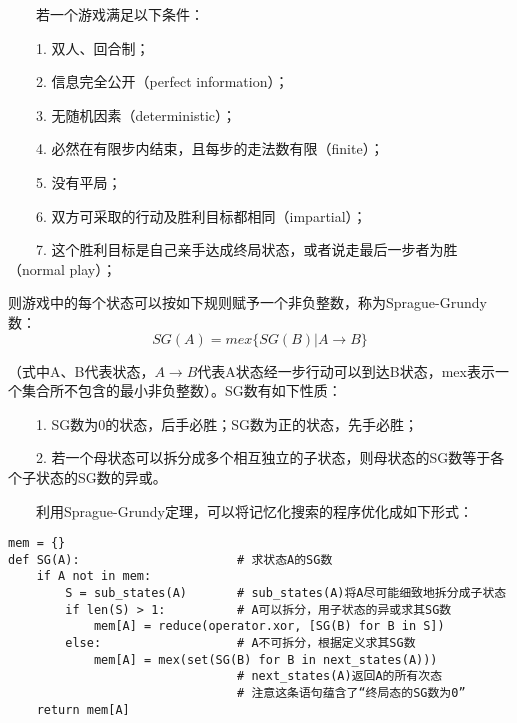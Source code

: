 　　若一个游戏满足以下条件：

　　1. 双人、回合制；

　　2. 信息完全公开（perfect information）；

　　3. 无随机因素（deterministic）；

　　4. 必然在有限步内结束，且每步的走法数有限（finite）；

　　5. 没有平局；

　　6. 双方可采取的行动及胜利目标都相同（impartial）；

　　7. 这个胜利目标是自己亲手达成终局状态，或者说走最后一步者为胜（normal play）；

则游戏中的每个状态可以按如下规则赋予一个非负整数，称为Sprague-Grundy数：
　　
	$$
	SG(A) = mex\{ SG(B)| A \to B\}
	$$

（式中A、B代表状态，$A \to B$代表A状态经一步行动可以到达B状态，mex表示一个集合所不包含的最小非负整数）。SG数有如下性质：

　　1. SG数为0的状态，后手必胜；SG数为正的状态，先手必胜；

　　2. 若一个母状态可以拆分成多个相互独立的子状态，则母状态的SG数等于各个子状态的SG数的异或。

　　利用Sprague-Grundy定理，可以将记忆化搜索的程序优化成如下形式：

\begin{lstlisting}
mem = {}
def SG(A):                      # 求状态A的SG数
    if A not in mem:
        S = sub_states(A)       # sub_states(A)将A尽可能细致地拆分成子状态
        if len(S) > 1:          # A可以拆分，用子状态的异或求其SG数
            mem[A] = reduce(operator.xor, [SG(B) for B in S])
        else:                   # A不可拆分，根据定义求其SG数
            mem[A] = mex(set(SG(B) for B in next_states(A)))
                                # next_states(A)返回A的所有次态
                                # 注意这条语句蕴含了“终局态的SG数为0”
    return mem[A]
\end{lstlisting}